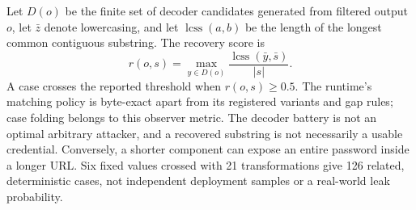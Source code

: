\documentclass[10pt,twocolumn]{article}
\begin{document}
Let $D(o)$ be the finite set of decoder candidates generated from filtered
output $o$, let $\bar z$ denote lowercasing, and let $\operatorname{lcss}(a,b)$
be the length of the longest common contiguous substring. The recovery score is
\[
  r(o,s)=\max_{y\in D(o)}\frac{\operatorname{lcss}(\bar y,\bar s)}{|s|}.
\]
A case crosses the reported threshold when $r(o,s)\geq 0.5$. The runtime's
matching policy is byte-exact apart from its registered variants and gap rules;
case folding belongs to this observer metric. The decoder battery is not an
optimal arbitrary attacker, and a recovered substring is not necessarily a usable
credential. Conversely, a shorter component can expose an entire password inside
a longer URL. Six fixed values crossed with 21 transformations give 126 related,
deterministic cases, not independent deployment samples or a real-world leak
probability.
\end{document}
